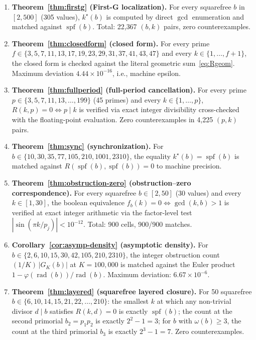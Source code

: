 \documentclass[11pt,reqno]{amsart}
\theoremstyle{plain}
\theoremstyle{definition}
\theoremstyle{remark}
\DeclareMathOperator{\spf}{spf}
\DeclareMathOperator{\rad}{rad}
\begin{document}
\begin{enumerate}[label={\upshape(\arabic*)}]
\item \textbf{Theorem~\ref{thm:firstg} (First-G localization).} For
every squarefree $b$ in $[2, 500]$ (305 values), $k^{\star}(b)$ is
computed by direct $\gcd$ enumeration and matched against $\spf(b)$.
Total: 22{,}367 $(b, k)$ pairs, zero counterexamples.

\item \textbf{Theorem~\ref{thm:closedform} (closed form).} For every
prime $f \in \{3, 5, 7, 11, 13, 17, 19, 23, 29, 31, 37, 41, 43, 47\}$
and every $k \in \{1, \dots, f + 1\}$, the closed form is checked
against the literal geometric sum~\eqref{eq:Rgeom}. Maximum deviation
$4.44 \times 10^{-16}$, i.e., machine epsilon.

\item \textbf{Theorem~\ref{thm:fullperiod} (full-period cancellation).}
For every prime $p \in \{3, 5, 7, 11, 13, \dots, 199\}$ (45 primes) and
every $k \in \{1, \dots, p\}$, $R(k, p) = 0 \Leftrightarrow p \mid k$
is verified via exact integer divisibility cross-checked with the
floating-point evaluation. Zero counterexamples in 4{,}225 $(p, k)$
pairs.

\item \textbf{Theorem~\ref{thm:sync} (synchronization).} For
$b \in \{10, 30, 35, 77, 105, 210, 1001, 2310\}$, the equality
$k^{\star}(b) = \spf(b)$ is matched against $R(\spf(b), \spf(b)) = 0$
to machine precision.

\item \textbf{Theorem~\ref{thm:obstruction-zero} (obstruction--zero
correspondence).} For every squarefree $b \in [2, 50]$ (30 values)
and every $k \in [1, 30]$, the boolean equivalence
$f_{b}(k) = 0 \Leftrightarrow \gcd(k, b) > 1$ is verified at exact
integer arithmetic via the factor-level test
$|\sin(\pi k/p_{j})| < 10^{-12}$. Total: 900 cells, 900/900 matches.

\item \textbf{Corollary~\ref{cor:asymp-density} (asymptotic density).}
For $b \in \{2, 6, 10, 15, 30, 42, 105, 210, 2310\}$, the integer
obstruction count $(1/K)\,|G_{K}(b)|$ at $K = 100{,}000$ is matched
against the Euler product $1 - \varphi(\rad(b))/\rad(b)$. Maximum
deviation: $6.67 \times 10^{-6}$.

\item \textbf{Theorem~\ref{thm:layered} (squarefree layered closure).}
For 50 squarefree $b \in \{6, 10, 14, 15, 21, 22, \dots, 210\}$: the
smallest $k$ at which any non-trivial divisor $d \mid b$ satisfies
$R(k, d) = 0$ is exactly $\spf(b)$; the count at the second primorial
$b_{2} = p_{1} p_{2}$ is exactly $2^{2} - 1 = 3$; for $b$ with
$\omega(b) \ge 3$, the count at the third primorial $b_{3}$ is
exactly $2^{3} - 1 = 7$. Zero counterexamples.


\end{enumerate}
\end{document}

